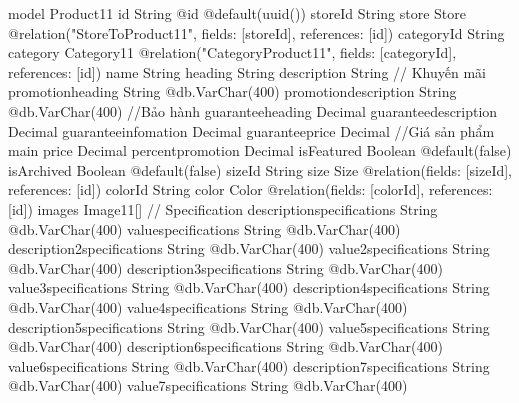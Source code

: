 model Product11 {
  id                           String                         @id @default(uuid())
  storeId                      String
  store                        Store                          @relation("StoreToProduct11", fields: [storeId], references: [id])
  categoryId                   String
  category                     Category11                     @relation("CategoryProduct11", fields: [categoryId], references: [id])
  name                         String
  heading                      String
  description                  String
  // Khuyến mãi
  promotionheading             String                         @db.VarChar(400)
  promotiondescription         String                         @db.VarChar(400)
  //Bảo hành
  guaranteeheading             Decimal
  guaranteedescription         Decimal
  guaranteeinfomation          Decimal
  guaranteeprice               Decimal
  //Giá sản phẩm main
  price                        Decimal
  percentpromotion             Decimal
  isFeatured                   Boolean                        @default(false)
  isArchived                   Boolean                        @default(false)
  sizeId                       String
  size                         Size                           @relation(fields: [sizeId], references: [id])
  colorId                      String
  color                        Color                          @relation(fields: [colorId], references: [id])
  images                       Image11[]
  // Specification
  descriptionspecifications    String                         @db.VarChar(400)
  valuespecifications          String                         @db.VarChar(400)
  description2specifications   String                         @db.VarChar(400)
  value2specifications         String                         @db.VarChar(400)
  description3specifications   String                         @db.VarChar(400)
  value3specifications         String                         @db.VarChar(400)
  description4specifications   String                         @db.VarChar(400)
  value4specifications         String                         @db.VarChar(400)
  description5specifications   String                         @db.VarChar(400)
  value5specifications         String                         @db.VarChar(400)
  description6specifications   String                         @db.VarChar(400)
  value6specifications         String                         @db.VarChar(400)
  description7specifications   String                         @db.VarChar(400)
  value7specifications         String                         @db.VarChar(400)
}
